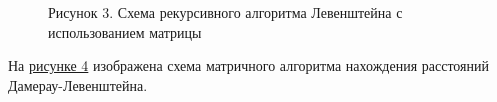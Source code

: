 \documentclass[12pt]{report}
\begin{document}
	\begin{figure}[h!]\label{picture_3}
		\caption*{Рисунок 3. Схема рекурсивного алгоритма Левенштейна с использованием матрицы}
	\end{figure}
	\newpage
	На \hyperref[picture_4]{рисунке 4} изображена схема матричного алгоритма нахождения расстояний Дамерау-Левенштейна.
\end{document}
